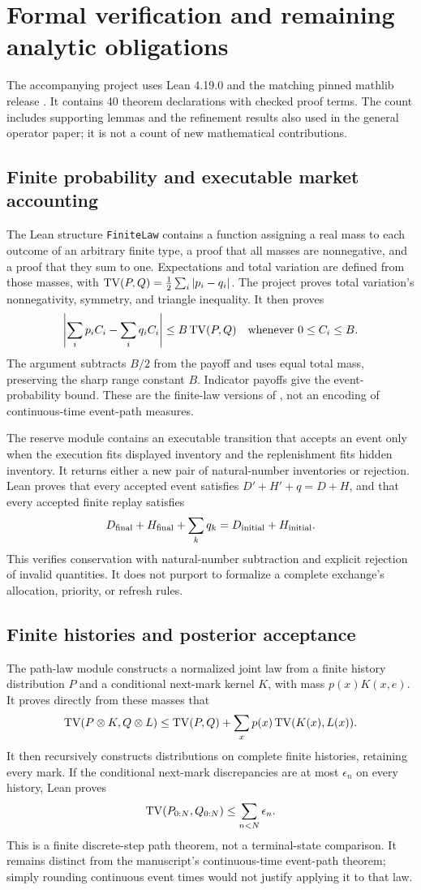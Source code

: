 \section{Formal verification and remaining analytic obligations}\label{sec:lean}
The accompanying project uses Lean 4.19.0 and the matching pinned mathlib release
\citep{demoura2021,mathlib2020}. It contains 40 theorem declarations with checked proof terms. The count includes supporting lemmas and the refinement results also used in the general operator paper; it is not a count of new mathematical contributions.

\subsection{Finite probability and executable market accounting}
The Lean structure \texttt{FiniteLaw} contains a function assigning a real mass to each outcome of an arbitrary finite type, a proof that all masses are nonnegative, and a proof that they sum to one. Expectations and total variation are defined from those masses, with
$\operatorname{TV}(P,Q)=\frac12\sum_i|p_i-q_i|$.
The project proves total variation's nonnegativity, symmetry, and triangle inequality. It then proves
\[
 \left|\sum_ip_iC_i-\sum_iq_iC_i\right|\le B\operatorname{TV}(P,Q)
 \quad\text{whenever }0\le C_i\le B.
\]
The argument subtracts $B/2$ from the payoff and uses equal total mass, preserving the sharp range constant $B$. Indicator payoffs give the event-probability bound. These are the finite-law versions of , not an encoding of continuous-time event-path measures.

The reserve module contains an executable transition that accepts an event only when the execution fits displayed inventory and the replenishment fits hidden inventory. It returns either a new pair of natural-number inventories or rejection. Lean proves that every accepted event satisfies
$D'+H'+q=D+H$, and that every accepted finite replay satisfies
\[
 D_{\rm final}+H_{\rm final}+\sum_kq_k=D_{\rm initial}+H_{\rm initial}.
\]
This verifies conservation with natural-number subtraction and explicit rejection of invalid quantities. It does not purport to formalize a complete exchange's allocation, priority, or refresh rules.

\subsection{Finite histories and posterior acceptance}
The path-law module constructs a normalized joint law from a finite history distribution $P$ and a conditional next-mark kernel $K$, with mass $p(x)K(x,e)$. It proves directly from these masses that
\[
 \operatorname{TV}(P\otimes K,Q\otimes L)
 \le\operatorname{TV}(P,Q)+\sum_xp(x)\operatorname{TV}(K(x),L(x)).
\]
It then recursively constructs distributions on complete finite histories, retaining every mark. If the conditional next-mark discrepancies are at most $\epsilon_n$ on every history, Lean proves
\[
 \operatorname{TV}(P_{0:N},Q_{0:N})\le\sum_{n<N}\epsilon_n.
\]
This is a finite discrete-step path theorem, not a terminal-state comparison. It remains distinct from the manuscript's continuous-time event-path theorem; simply rounding continuous event times would not justify applying it to that law.

